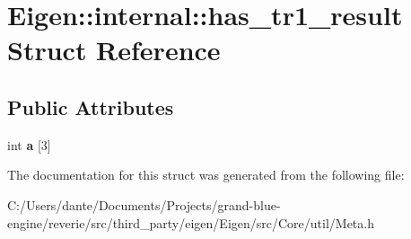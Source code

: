 \hypertarget{struct_eigen_1_1internal_1_1has__tr1__result}{}\section{Eigen\+::internal\+::has\+\_\+tr1\+\_\+result Struct Reference}
\label{struct_eigen_1_1internal_1_1has__tr1__result}
\subsection*{Public Attributes}
\begin{DoxyCompactItemize}
\item 
\mbox{\label{struct_eigen_1_1internal_1_1has__tr1__result_a83cfe6cb453f0b0daf227f0c1c95f852}} 
int {\bfseries a} \mbox{[}3\mbox{]}
\end{DoxyCompactItemize}


The documentation for this struct was generated from the following file\+:\begin{DoxyCompactItemize}
\item 
C\+:/\+Users/dante/\+Documents/\+Projects/grand-\/blue-\/engine/reverie/src/third\+\_\+party/eigen/\+Eigen/src/\+Core/util/Meta.\+h\end{DoxyCompactItemize}
